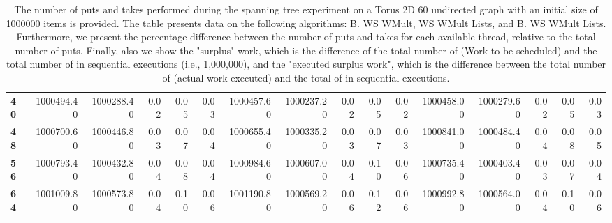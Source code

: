 \begin{table}[!ht]
{\begin{tabular}{lrrrrrrrrrrrrrrr}
\textbf{40} &  1000494.40 & 1000288.40 &           0.02 &        0.05 &                 0.03 &     1000457.60 & 1000237.20 &           0.02 &        0.05 &                 0.02 &        1000458.00 & 1000279.60 &           0.02 &        0.05 &                 0.03 \\
\textbf{48} &  1000700.60 & 1000446.80 &           0.03 &        0.07 &                 0.04 &     1000655.40 & 1000335.20 &           0.03 &        0.07 &                 0.03 &        1000841.00 & 1000484.40 &           0.04 &        0.08 &                 0.05 \\
\textbf{56} &  1000793.40 & 1000432.80 &           0.04 &        0.08 &                 0.04 &     1000984.60 & 1000607.00 &           0.04 &        0.10 &                 0.06 &        1000735.40 & 1000403.40 &           0.03 &        0.07 &                 0.04 \\
\textbf{64} &  1001009.80 & 1000573.80 &           0.04 &        0.10 &                 0.06 &     1001190.80 & 1000569.20 &           0.06 &        0.12 &                 0.06 &        1000992.80 & 1000564.00 &           0.04 &        0.10 &                 0.06 \\
\bottomrule
\end{tabular}}
\label{difference-Torus_2D_60_undirected-1000000-B_WS_NC_MULT_OPT-WS_NC_MULT_LA_OPT-B_WS_NC_MULT_LA_OPT}
\caption{The number of puts and takes performed during the
    spanning tree experiment on a Torus 2D 60 undirected graph with an initial size
    of 1000000 items is provided. The table presents data on the
    following algorithms: B. WS WMult, WS WMult Lists, and
    B. WS WMult Lists. Furthermore, we present the percentage difference
    between the number of puts and takes for each available thread,
    relative to the total number of puts. Finally, also we show the
    "surplus" work, which is the difference of the total number of
    \Puts (Work to be scheduled) and the total number of \Puts in
    sequential executions (i.e., 1,000,000), and the "executed surplus
    work", which is the difference between the total number of \Takes
    (actual work executed) and the total of \Takes in sequential
    executions.}
\end{table}
